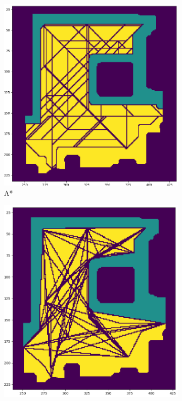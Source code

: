 \begin{figure}[h]
    \captionsetup[subfigure]{justification=centering}
    \centering
    \begin{subfigure}{.25\textwidth}
      \centering
      \includegraphics[width=\textwidth]{figures/60_results/room2_disturbance_astar_unsmoothed.png}
      \caption{A*}
    \end{subfigure}%
    \begin{subfigure}{.24\textwidth}
      \centering
      \includegraphics[width=\textwidth]{figures/60_results/room2_disturbance_astar_smooth.png}

\end{subfigure}
\end{figure}
